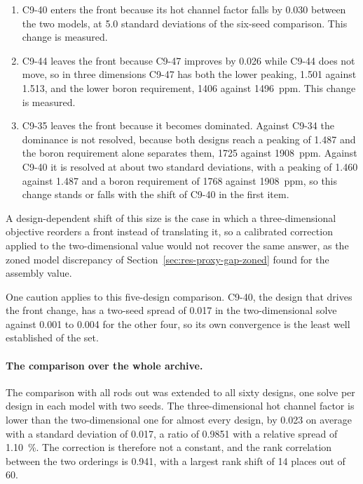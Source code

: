 \begin{enumerate}
  \item C9-40 enters the front because its hot channel factor falls by
        0.030 between the two models, at 5.0 standard deviations of the
        six-seed comparison. This change is measured.

  \item C9-44 leaves the front because C9-47 improves by 0.026 while C9-44
        does not move, so in three dimensions C9-47 has both the lower
        peaking, 1.501 against 1.513, and the lower boron requirement, 1406
        against \SI{1496}{ppm}. This change is measured.

  \item C9-35 leaves the front because it becomes dominated. Against C9-34
        the dominance is not resolved, because both designs reach a peaking
        of 1.487 and the boron requirement alone separates them, 1725
        against \SI{1908}{ppm}. Against C9-40 it is resolved at about two
        standard deviations, with a peaking of 1.460 against 1.487 and a
        boron requirement of 1768 against \SI{1908}{ppm}, so this change
        stands or falls with the shift of C9-40 in the first item.
\end{enumerate}

A design-dependent shift of this size is the case in which a
three-dimensional objective reorders a front instead of translating it, so
a calibrated correction applied to the two-dimensional value would not
recover the same answer, as the zoned model discrepancy of
Section~\ref{sec:res-proxy-gap-zoned} found for the assembly value.

One caution applies to this five-design comparison. C9-40, the design
that drives the front change, has a two-seed spread of 0.017 in the
two-dimensional solve against 0.001 to 0.004 for the other four, so its
own convergence is the least well established of the set.

\paragraph{The comparison over the whole archive.}
The comparison with all rods out was extended to all sixty designs, one
solve per design in each model with two seeds. The three-dimensional hot
channel factor is lower than the two-dimensional one for almost every
design, by 0.023 on average with a standard deviation of 0.017, a ratio of
0.9851 with a relative spread of \SI{1.10}{\%}. The correction is therefore
not a constant, and the rank correlation between the two orderings is 0.941,
with a largest rank shift of 14 places out of 60.

